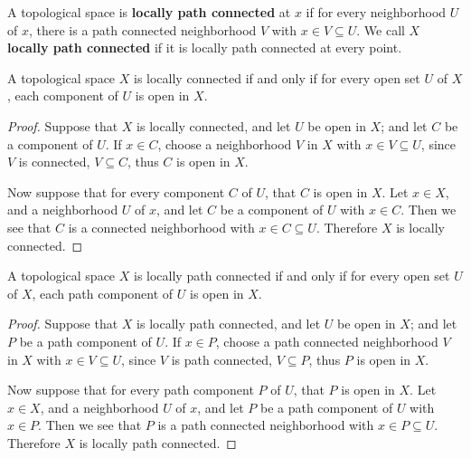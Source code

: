 \begin{definition}
    A topological space is \textbf{locally path connected} at $x$ if for every neighborhood  $U$ of  $x$,
    there is a path connected neighborhood  $V$ with $x \in V \subseteq U$. We call  $X$  \textbf{locally
    path connected} if it is locally path connected at every point.
\end{definition}

\begin{theorem}\label{3.3.6}
    A topological space $X$ is locally connected if and only if for every open set $U$ of $X$, each
    component of  $U$ is open in  $X$.
\end{theorem}
\begin{proof}
    Suppose that $X$ is locally connected, and let  $U$ be open in  $X$; and let  $C$ be a component
    of  $U$. If  $x \in C$, choose a neighborhood $V$ in $X$ with $x \in V \subseteq U$, since  $V$ is
    connected,  $V \subseteq C$, thus  $C$ is open in  $X$.

    Now suppose that for every component  $C$ of  $U$, that  $C$ is open in  $X$. Let  $x \in X$,
    and a neighborhood  $U$ of  $x$, and let  $C$ be a component of  $U$ with  $x \in C$. Then we
    see that $C$ is a connected neighborhood with  $x \in C \subseteq U$. Therefore  $X$ is locally
    connected.
\end{proof}

\begin{theorem}\label{3.3.7}
    A topological space $X$ is locally path connected if and only if for every open set $U$ of $X$, each
    path component of  $U$ is open in  $X$.
\end{theorem}
\begin{proof}
    Suppose that $X$ is locally path connected, and let  $U$ be open in  $X$; and let  $P$ be a path component
    of  $U$. If  $x \in P$, choose a path connected neighborhood $V$ in $X$ with $x \in V \subseteq U$, since  $V$ is
    path connected,  $V \subseteq P$, thus  $P$ is open in  $X$.

    Now suppose that for every path component  $P$ of  $U$, that  $P$ is open in  $X$. Let  $x \in X$,
    and a neighborhood  $U$ of  $x$, and let  $P$ be a path component of  $U$ with  $x \in P$. Then we
    see that $P$ is a path connected neighborhood with  $x \in P \subseteq U$. Therefore  $X$ is locally
    path connected.
\end{proof}


